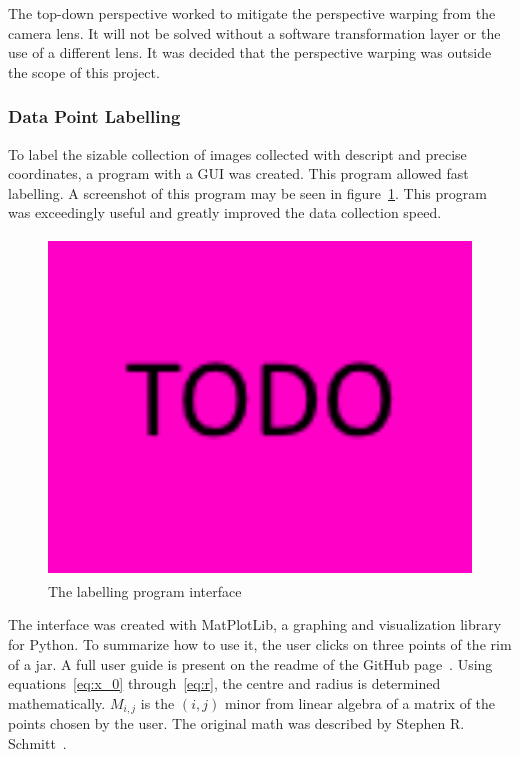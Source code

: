 \documentclass[11pt]{article}
\begin{document}
                The top-down perspective worked to mitigate the perspective warping from the camera lens. It will not be solved without a software transformation layer or the use of a different lens. It was decided that the perspective warping was outside the scope of this project.

            \subsubsection{Data Point Labelling}
                To label the sizable collection of images collected with descript and precise coordinates, a program with a GUI was created. This program allowed fast labelling. A screenshot of this program may be seen in figure~\ref{fig:label-gui}. This program was exceedingly useful and greatly improved the data collection speed.

                \begin{figure}[ht]
                    \centering
                    \includegraphics[height=9cm]{images/TODO.png}
                    \caption{The labelling program interface}\label{fig:label-gui}
                \end{figure}

                The interface was created with MatPlotLib, a graphing and visualization library for Python. To summarize how to use it, the user clicks on three points of the rim of a jar. A full user guide is present on the readme of the GitHub page~\cite{akkerman_hunter}. Using equations~\ref{eq:x_0} through~\ref{eq:r}, the centre and radius is determined mathematically.  \(M_{i,j}\) is the \((i,j)\) minor from linear algebra of a matrix of the points chosen by the user. The original math was described by Stephen R. Schmitt~\cite{schmitt}.
\end{document}
